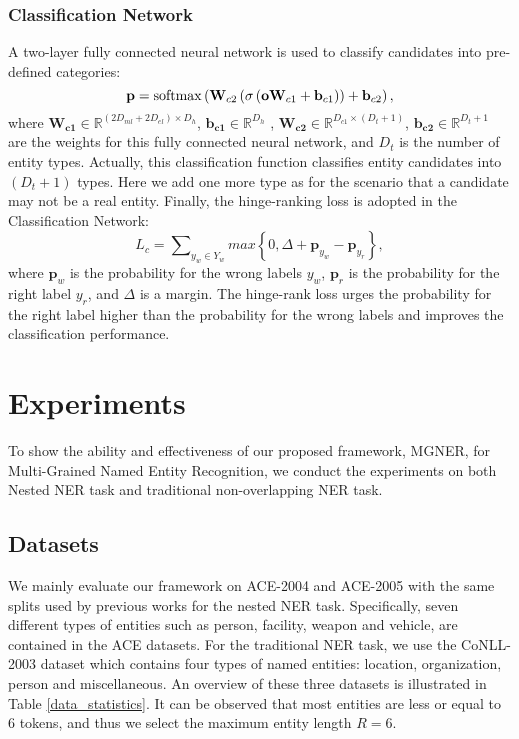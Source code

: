 \documentclass[11pt,a4paper]{article}
\newcommand{\ModelName}{\textsc{MGNER}}
\newcommand{\multi}{Multi-Grained}
\begin{document}
\subsubsection{Classification Network}
A two-layer fully connected neural network is used to classify candidates into pre-defined categories:
\begin{equation}
   \mathbf{p}= {\rm softmax}\left({ \mathbf{W}_{c2}\left( {\sigma \left (\mathbf{o}\mathbf{W}_{c1} + \mathbf{b}_{c1}\right )}\right)}  + \mathbf{b}_{c2} \right),
\end{equation}
where $\mathbf{W_{c1}} \in \mathbb{R}^{(2D_{ml}+2D_{el}) \times D_h}$, $\mathbf{b_{c1}} \in \mathbb{R}^{D_h}$ , $\mathbf{W_{c2}} \in \mathbb{R}^{D_{c1} \times (D_{t}+1)}$, $\mathbf{b_{c2}} \in \mathbb{R}^{D_t+1}$ are the weights for this fully connected neural network, and $D_t$ is the number of entity types. Actually, this classification function classifies entity candidates into $(D_{t}+1)$ types. Here we add one more type as for the scenario that a candidate may not be a real entity.
Finally, the hinge-ranking loss is adopted in the Classification Network:
\begin{equation}
L_{c} =  \sum\nolimits_{y_w \in Y_w} max \left \{  0,\Delta +\mathbf{p}_{y_w} - \mathbf{p}_{y_r}  \right \},
\end{equation}
where $\mathbf{p}_{w}$ is the probability for the wrong labels $y_w$, $\mathbf{p}_{r}$ is the probability for the right label $y_r$, and $\Delta$ is a margin.
The hinge-rank loss urges the probability for the right label higher than the probability for the wrong labels and improves the classification performance. \section{Experiments}
To show the ability and effectiveness of our proposed framework, {\ModelName}, for {\multi} Named Entity Recognition, we conduct the experiments on both Nested NER task and traditional non-overlapping NER task.

\subsection{Datasets}
We mainly evaluate our framework on ACE-2004 and ACE-2005 \cite{doddington2004automatic} with the same splits used by previous works \cite{luo2015joint, wang2018neural} for the nested NER task. Specifically, seven different types of entities such as person, facility, weapon and vehicle, are contained in the ACE datasets.
For the traditional NER task, we use the CoNLL-2003 dataset \cite{tjong2003introduction} which contains four types of named entities: location, organization, person and miscellaneous. 
An overview of these three datasets is illustrated in Table \ref{data_statistics}. It can be observed that most entities are less or equal to 6 tokens, and thus we select the maximum entity length $R=6$.
\end{document}

